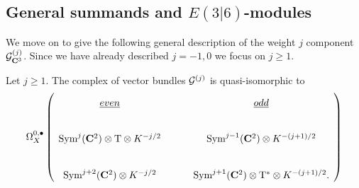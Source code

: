 \documentclass[../main.tex]{subfiles}
\begin{document}


\subsection{General summands and $E(3|6)$-modules}

We move on to give the following general description of the weight $j$ component $\mathcal{G}_{\mathbf{C}^3} ^{(j)}$.
Since we have already described $j = -1,0$ we focus on $j \geq 1$.

\begin{prop}
\label{prop:Vj}
Let $j \geq 1$. 
The complex of vector bundles $\mathcal{G}^{(j)}$ is quasi-isomorphic to
\begin{equation}
\label{eqn:Gj}
\Omega^{0,\bullet}_{X} \left (\begin{tikzcd}
\ul{even} & \ul{odd} \\
\Sym^{j}(\C^2) \otimes \T \otimes K^{-j/2} & \Sym^{j-1}(\C^2) \otimes K^{-(j+1)/2}\\
\Sym^{j+2}(\C^2) \otimes K^{-j/2} & \Sym^{j+1}(\C^2) \otimes \T^* \otimes K^{-(j+1)/2} .
\end{tikzcd}\right )
\end{equation}
\end{prop}
\end{document}
